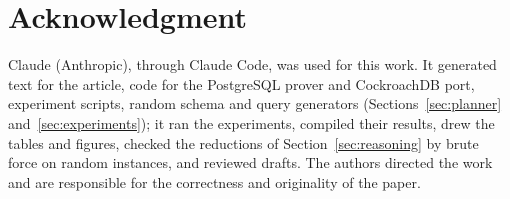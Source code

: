 \documentclass[conference]{IEEEtran}
\theoremstyle{definition}
\newif\ifextended
\begin{document}
\section*{Acknowledgment}
Claude (Anthropic), through Claude Code, was used for this work. It generated text for the article, code for the PostgreSQL prover and CockroachDB port, experiment
scripts, random schema and query generators (Sections~\ref{sec:planner}
and~\ref{sec:experiments}); it ran the experiments, compiled their results, drew the tables and
figures, checked the reductions of Section~\ref{sec:reasoning} by brute force on random instances,
and reviewed drafts. The authors directed the work and are responsible for the correctness and
originality of the paper.

\ifextended\IEEEtriggeratref{47}\else{}\fi
\end{document}
